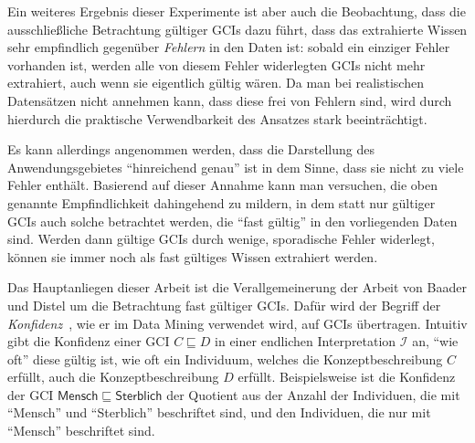 \documentclass[ngerman,fleqn,DIV=14]{scrartcl}
\begin{document}
Ein weiteres Ergebnis dieser Experimente ist aber auch die Beobachtung, dass die
ausschließliche Betrachtung gültiger GCIs dazu führt, dass das extrahierte Wissen sehr
empfindlich gegenüber \emph{Fehlern} in den Daten ist: sobald ein einziger Fehler
vorhanden ist, werden alle von diesem Fehler widerlegten GCIs nicht mehr extrahiert, auch
wenn sie eigentlich gültig wären.  Da man bei realistischen Datensätzen nicht annehmen
kann, dass diese frei von Fehlern sind, wird durch hierdurch die praktische Verwendbarkeit
des Ansatzes stark beeinträchtigt.

Es kann allerdings angenommen werden, dass die Darstellung des Anwendungsgebietes
\enquote{hinreichend genau} ist in dem Sinne, dass sie nicht zu viele Fehler enthält.
Basierend auf dieser Annahme kann man versuchen, die oben genannte Empfindlichkeit
dahingehend zu mildern, in dem statt nur gültiger GCIs auch solche betrachtet werden, die
\enquote{fast gültig} in den vorliegenden Daten sind.  Werden dann gültige GCIs durch
wenige, sporadische Fehler widerlegt, können sie immer noch als fast gültiges Wissen
extrahiert werden.

Das Hauptanliegen dieser Arbeit ist die Verallgemeinerung der Arbeit von Baader und Distel
um die Betrachtung fast gültiger GCIs.  Dafür wird der Begriff der
\emph{Konfidenz}~\cite{arules:agrawal:association-rules}, wie er im Data Mining verwendet
wird, auf GCIs übertragen.  Intuitiv gibt die Konfidenz einer GCI $C \sqsubseteq D$ in
einer endlichen Interpretation $\mathcal{I}$ an, \enquote{wie oft} diese gültig ist, \dh
wie oft ein Individuum, welches die Konzeptbeschreibung $C$ erfüllt, auch die
Konzeptbeschreibung $D$ erfüllt.  Beispielsweise ist die Konfidenz der GCI
$\mathsf{Mensch} \sqsubseteq \mathsf{Sterblich}$ der Quotient aus der Anzahl der
Individuen, die mit \enquote{\textsf{Mensch}} und \enquote{\textsf{Sterblich}} beschriftet
sind, und den Individuen, die nur mit \enquote{\textsf{Mensch}} beschriftet sind.
\end{document}
